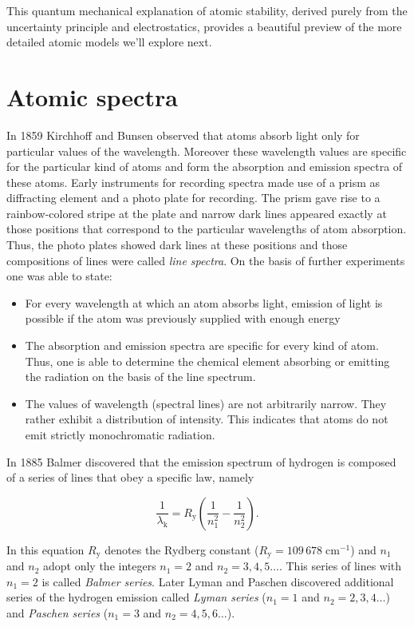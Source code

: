 \documentclass[
  a4paper,
]{book}
\begin{document}
This quantum mechanical explanation of atomic stability, derived purely
from the uncertainty principle and electrostatics, provides a beautiful
preview of the more detailed atomic models we'll explore next.

\section{Atomic spectra}\label{atomic-spectra}

In 1859 Kirchhoff and Bunsen observed that atoms absorb light only for
particular values of the wavelength. Moreover these wavelength values
are specific for the particular kind of atoms and form the absorption
and emission spectra of these atoms. Early instruments for recording
spectra made use of a prism as diffracting element and a photo plate for
recording. The prism gave rise to a rainbow-colored stripe at the plate
and narrow dark lines appeared exactly at those positions that
correspond to the particular wavelengths of atom absorption. Thus, the
photo plates showed dark lines at these positions and those compositions
of lines were called \emph{line spectra}. On the basis of further
experiments one was able to state:

\begin{itemize}
\item
  For every wavelength at which an atom absorbs light, emission of light
  is possible if the atom was previously supplied with enough energy
\item
  The absorption and emission spectra are specific for every kind of
  atom. Thus, one is able to determine the chemical element absorbing or
  emitting the radiation on the basis of the line spectrum.
\item
  The values of wavelength (spectral lines) are not arbitrarily narrow.
  They rather exhibit a distribution of intensity. This indicates that
  atoms do not emit strictly monochromatic radiation.
\end{itemize}

In 1885 Balmer discovered that the emission spectrum of hydrogen is
composed of a series of lines that obey a specific law, namely

\[
\frac{1}{\lambda_{\mathrm{k}}} = R_{\mathrm{y}} \left( \frac{1}{n_1^2} -\frac{1}{n_2^2} \right) \mathrm{.}
\]

In this equation \(R_{\mathrm{y}}\) denotes the Rydberg constant
(\(R_{\mathrm{y}} = 109 \, 678 \; \mathrm{cm}^{-1}\)) and \(n_1\) and
\(n_2\) adopt only the integers \(n_1 = 2\) and \(n_2 = 3,4,5 \ldots\).
This series of lines with \(n_1 = 2\) is called \emph{Balmer series}.
Later Lyman and Paschen discovered additional series of the hydrogen
emission called \emph{Lyman series} (\(n_1 = 1\) and
\(n_2 = 2,3,4 \ldots\)) and \emph{Paschen series} (\(n_1 = 3\) and
\(n_2 = 4,5,6 \ldots\)).
\end{document}
